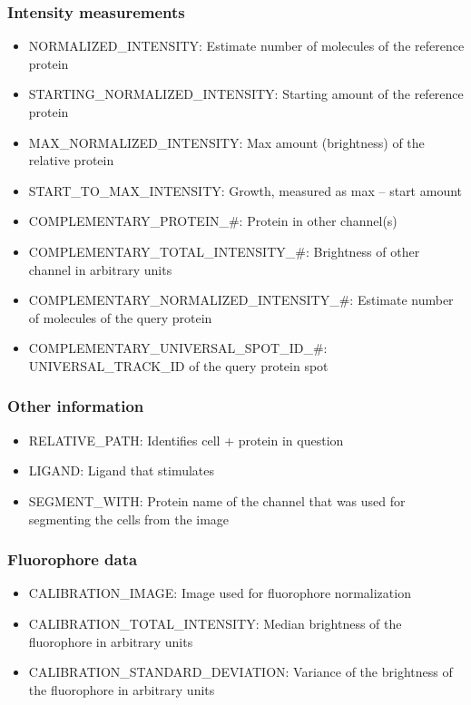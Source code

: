 \subsubsection{Intensity measurements}
\begin{itemize}
\item NORMALIZED\_INTENSITY: Estimate number of molecules of the reference protein
\item STARTING\_NORMALIZED\_INTENSITY: Starting amount of the reference protein
\item MAX\_NORMALIZED\_INTENSITY: Max amount (brightness) of the relative protein
\item START\_TO\_MAX\_INTENSITY: Growth, measured as max – start amount
\item COMPLEMENTARY\_PROTEIN\_\#: Protein in other channel(s)
\item COMPLEMENTARY\_TOTAL\_INTENSITY\_\#: Brightness of other channel in arbitrary units
\item COMPLEMENTARY\_NORMALIZED\_INTENSITY\_\#: Estimate number of molecules of the query protein
\item COMPLEMENTARY\_UNIVERSAL\_SPOT\_ID\_\#: UNIVERSAL\_TRACK\_ID of the query protein spot
\end{itemize}

\subsubsection{Other information}
\begin{itemize}
\item RELATIVE\_PATH: Identifies cell + protein in question
\item LIGAND: Ligand that stimulates
\item SEGMENT\_WITH: Protein name of the channel that was used for segmenting the cells from the image
\end{itemize}

\subsubsection{Fluorophore data}
\begin{itemize}
\item CALIBRATION\_IMAGE: Image used for fluorophore normalization
\item CALIBRATION\_TOTAL\_INTENSITY: Median brightness of the fluorophore in arbitrary units
\item CALIBRATION\_STANDARD\_DEVIATION: Variance of the brightness of the fluorophore in arbitrary units
\end{itemize}

